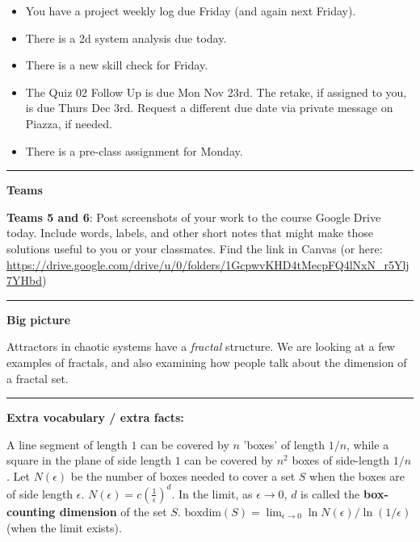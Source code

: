 \documentclass[12pt,letterpaper,noanswers]{exam}
\begin{document}
 \pdfpageheight 11in 
  \pdfpagewidth 8.5in

\noindent 




\begin{itemize}
\itemsep0em
\item You have a project weekly log due Friday (and again next Friday).
\item There is a 2d system analysis due today.
\item There is a new skill check for Friday.
\item The Quiz 02 Follow Up is due Mon Nov 23rd.  The retake, if assigned to you, is due Thurs Dec 3rd.  Request a different due date via private message on Piazza, if needed.
\item There is a pre-class assignment for Monday.
\end{itemize}

\hrule
\vspace{0.2cm}



\noindent\textbf{Teams}




\noindent \textbf{Teams 5 and 6}: Post screenshots of your work to the course Google Drive today.  Include words, labels, and other short notes that might make those solutions useful to you or your classmates.  Find the link in Canvas (or here: \url{https://drive.google.com/drive/u/0/folders/1GcpwvKHD4tMecpFQ4lNxN_r5Ylj7YHbd})


\vspace{0.2cm}

\hrule
\vspace{0.2cm}


\noindent\textbf{Big picture}

Attractors in chaotic systems have a \emph{fractal} structure.  We are looking at a few examples of fractals, and also examining how people talk about the dimension of a fractal set.

\vspace{0.2cm}
\hrule
\vspace{0.2cm}

\noindent \textbf{Extra vocabulary / extra facts:}
\begin{tcolorbox}

A line segment of length $1$ can be covered by $n$ 'boxes' of length $1/n$, while a square in the plane of side length $1$ can be covered by $n^2$ boxes of side-length $1/n$.  Let $N(\epsilon)$ be the number of boxes needed to cover a set $S$ when the boxes are of side length $\epsilon$.  $N(\epsilon) = c\left(\frac{1}{\epsilon}\right)^d$.  In the limit, as $\epsilon \rightarrow 0$, $d$ is called the \textbf{box-counting dimension} of the set $S$.  $\text{boxdim}(S) = \lim_{\epsilon\rightarrow 0} \ln N(\epsilon)/\ln(1/\epsilon)$ (when the limit exists).
\end{tcolorbox}
\end{document}
